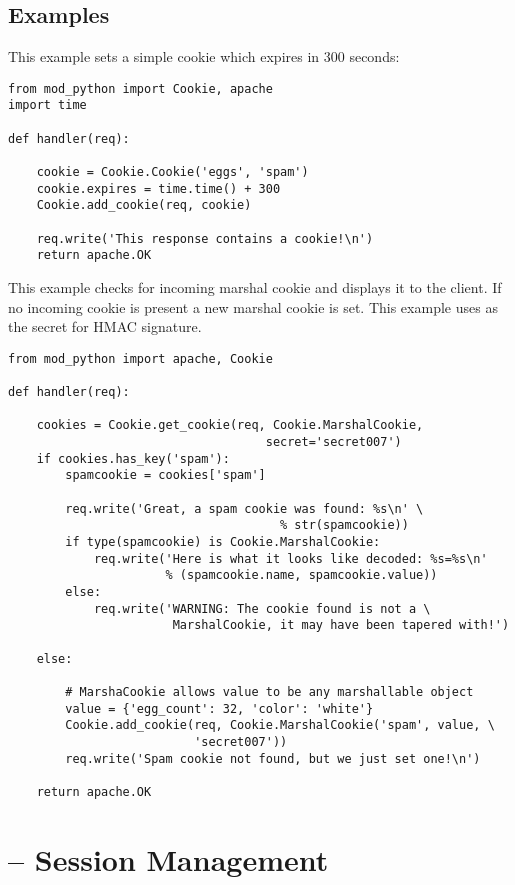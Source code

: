 \subsection{Examples\label{pyapi-cookie-example}}

This example sets a simple cookie which expires in 300 seconds:

\begin{verbatim}
from mod_python import Cookie, apache
import time

def handler(req):

    cookie = Cookie.Cookie('eggs', 'spam')
    cookie.expires = time.time() + 300
    Cookie.add_cookie(req, cookie)

    req.write('This response contains a cookie!\n')
    return apache.OK

\end{verbatim}

This example checks for incoming marshal cookie and displays it to the
client. If no incoming cookie is present a new marshal cookie is set.
This example uses  as the secret for HMAC signature.

\begin{verbatim}
from mod_python import apache, Cookie

def handler(req):
    
    cookies = Cookie.get_cookie(req, Cookie.MarshalCookie,
                                    secret='secret007')
    if cookies.has_key('spam'):
        spamcookie = cookies['spam']

        req.write('Great, a spam cookie was found: %s\n' \
                                      % str(spamcookie))
        if type(spamcookie) is Cookie.MarshalCookie:
            req.write('Here is what it looks like decoded: %s=%s\n'
                      % (spamcookie.name, spamcookie.value))
        else:
            req.write('WARNING: The cookie found is not a \
                       MarshalCookie, it may have been tapered with!')

    else:

        # MarshaCookie allows value to be any marshallable object
        value = {'egg_count': 32, 'color': 'white'}
        Cookie.add_cookie(req, Cookie.MarshalCookie('spam', value, \
                          'secret007'))
        req.write('Spam cookie not found, but we just set one!\n')

    return apache.OK
\end{verbatim}

\section{ -- Session Management\label{pyapi-sess}}
\modulesynopsis{Session Management}

